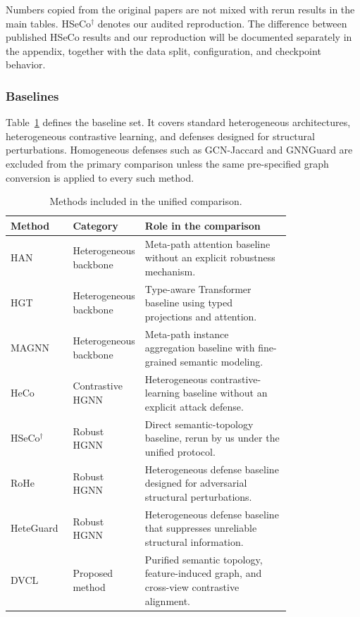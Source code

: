 Numbers copied from the original papers are not mixed with rerun results in the main tables. HSeCo$^{\dagger}$ denotes our audited reproduction. The difference between published HSeCo results and our reproduction will be documented separately in the appendix, together with the data split, configuration, and checkpoint behavior.

\subsubsection{Baselines}

Table~\ref{tab:baselines} defines the baseline set. It covers standard heterogeneous architectures, heterogeneous contrastive learning, and defenses designed for structural perturbations. Homogeneous defenses such as GCN-Jaccard and GNNGuard are excluded from the primary comparison unless the same pre-specified graph conversion is applied to every such method.

\begin{table}[htbp]
\centering
\small
\caption{Methods included in the unified comparison.}
\label{tab:baselines}
\begin{tabular}{lp{0.23\linewidth}p{0.56\linewidth}}
\toprule
Method & Category & Role in the comparison \\
\midrule
HAN~\cite{wang2019han} & Heterogeneous backbone & Meta-path attention baseline without an explicit robustness mechanism. \\
HGT~\cite{hu2020hgt} & Heterogeneous backbone & Type-aware Transformer baseline using typed projections and attention. \\
MAGNN~\cite{fu2020magnn} & Heterogeneous backbone & Meta-path instance aggregation baseline with fine-grained semantic modeling. \\
HeCo~\cite{wang2021heco} & Contrastive HGNN & Heterogeneous contrastive-learning baseline without an explicit attack defense. \\
HSeCo$^{\dagger}$~\cite{hseco} & Robust HGNN & Direct semantic-topology baseline, rerun by us under the unified protocol. \\
RoHe~\cite{rohe} & Robust HGNN & Heterogeneous defense baseline designed for adversarial structural perturbations. \\
HeteGuard~\cite{heteguard} & Robust HGNN & Heterogeneous defense baseline that suppresses unreliable structural information. \\
DVCL & Proposed method & Purified semantic topology, feature-induced graph, and cross-view contrastive alignment. \\
\bottomrule
\end{tabular}
\end{table}

